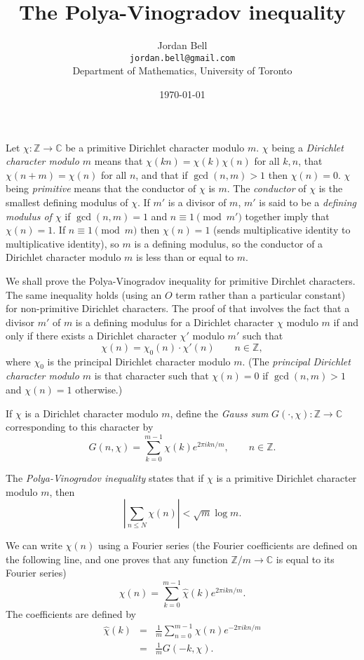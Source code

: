 \documentclass{article}
\begin{document}
\title{The Polya-Vinogradov inequality}
\author{Jordan Bell\\ \texttt{jordan.bell@gmail.com}\\Department of Mathematics, University of Toronto}
\date{\today}

\maketitle

Let $\chi:\mathbb{Z} \to \mathbb{C}$ be a primitive Dirichlet character modulo $m$. $\chi$ being a {\em Dirichlet character modulo $m$} means that $\chi(kn)=\chi(k)\chi(n)$ for all $k,n$, that
$\chi(n+m)=\chi(n)$ for all $n$, and that if $\gcd(n,m)>1$ then $\chi(n)=0$. $\chi$ being {\em primitive} means that the conductor of $\chi$ is $m$. The {\em conductor} of
$\chi$ is the smallest defining modulus of $\chi$. If $m'$ is a divisor of $m$, $m'$ is said to be a {\em defining modulus of $\chi$} if $\gcd(n,m)=1$ and $n \equiv 1 \pmod{m'}$ together imply
that $\chi(n)=1$. If $n \equiv 1 \pmod{m}$ then $\chi(n)=1$ (sends multiplicative identity to multiplicative identity), so $m$ is a defining modulus, so the conductor of a Dirichlet character modulo $m$ is less than or equal to $m$.

We shall prove the Polya-Vinogradov inequality for primitive Dirchlet characters. The same inequality holds (using an $O$ term rather than a particular constant) for non-primitive Dirichlet
characters. The proof of that involves the fact \cite[p.~152, Proposition~8]{schoiss} that a divisor $m'$ of $m$ is a defining modulus for a Dirichlet character $\chi$ modulo $m$ if and only if there
exists a Dirichlet character $\chi'$ modulo $m'$ such that 
\[
\chi(n)=\chi_0(n) \cdot \chi'(n) \qquad n \in \mathbb{Z},
\]
where $\chi_0$ is the principal Dirichlet character modulo $m$. (The {\em principal Dirichlet character modulo $m$} is that character such that $\chi(n)=0$ if $\gcd(n,m)>1$ and 
$\chi(n)=1$ otherwise.)

If $\chi$ is a Dirichlet character modulo $m$, define the {\em Gauss sum} $G(\cdot,\chi):\mathbb{Z} \to \mathbb{C}$ corresponding to this character by
\[
G(n,\chi)=\sum_{k=0}^{m-1} \chi(k) e^{2\pi ikn/m}, \qquad n \in \mathbb{Z}.
\]

The {\em Polya-Vinogradov inequality} states that if $\chi$ is a primitive Dirichlet character modulo $m$, then
\[
\left| \sum_{n \leq N} \chi(n) \right| < \sqrt{m} \log m.
\]

We can write $\chi(n)$ using a Fourier series (the Fourier coefficients are defined on the following line, and one proves that any function $\mathbb{Z}/m \to \mathbb{C}$ is
equal to its Fourier series)
\[
\chi(n)=\sum_{k=0}^{m-1} \hat{\chi}(k)e^{2\pi ikn/m}.
\]
The coefficients are defined by
\begin{eqnarray*}
\hat{\chi}(k)&=&\frac{1}{m}\sum_{n=0}^{m-1} \chi(n) e^{-2\pi ikn/m}\\
&=&\frac{1}{m}G(-k,\chi).
\end{eqnarray*}
\end{document}
